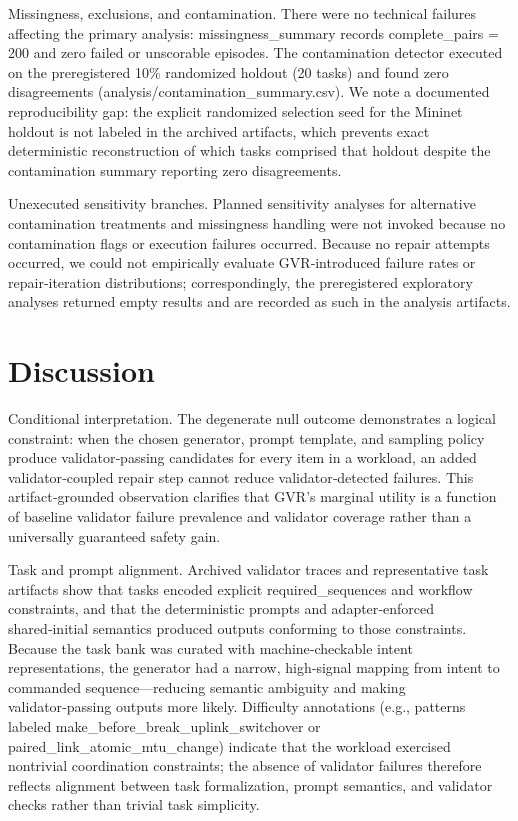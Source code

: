 \documentclass[conference]{IEEEtran}
\begin{document}
Missingness, exclusions, and contamination. There were no technical failures affecting the primary analysis: missingness\_summary records complete\_pairs = 200 and zero failed or unscorable episodes. The contamination detector executed on the preregistered 10\% randomized holdout (20 tasks) and found zero disagreements (analysis/contamination\_summary.csv). We note a documented reproducibility gap: the explicit randomized selection seed for the Mininet holdout is not labeled in the archived artifacts, which prevents exact deterministic reconstruction of which tasks comprised that holdout despite the contamination summary reporting zero disagreements.

Unexecuted sensitivity branches. Planned sensitivity analyses for alternative contamination treatments and missingness handling were not invoked because no contamination flags or execution failures occurred. Because no repair attempts occurred, we could not empirically evaluate GVR‑introduced failure rates or repair‑iteration distributions; correspondingly, the preregistered exploratory analyses returned empty results and are recorded as such in the analysis artifacts.

\section{Discussion}
Conditional interpretation. The degenerate null outcome demonstrates a logical constraint: when the chosen generator, prompt template, and sampling policy produce validator‑passing candidates for every item in a workload, an added validator‑coupled repair step cannot reduce validator‑detected failures. This artifact‑grounded observation clarifies that GVR's marginal utility is a function of baseline validator failure prevalence and validator coverage rather than a universally guaranteed safety gain.

Task and prompt alignment. Archived validator traces and representative task artifacts show that tasks encoded explicit required\_sequences and workflow constraints, and that the deterministic prompts and adapter‑enforced shared‑initial semantics produced outputs conforming to those constraints. Because the task bank was curated with machine‑checkable intent representations, the generator had a narrow, high‑signal mapping from intent to commanded sequence---reducing semantic ambiguity and making validator‑passing outputs more likely. Difficulty annotations (e.g., patterns labeled make\_before\_break\_uplink\_switchover or paired\_link\_atomic\_mtu\_change) indicate that the workload exercised nontrivial coordination constraints; the absence of validator failures therefore reflects alignment between task formalization, prompt semantics, and validator checks rather than trivial task simplicity.
\end{document}
